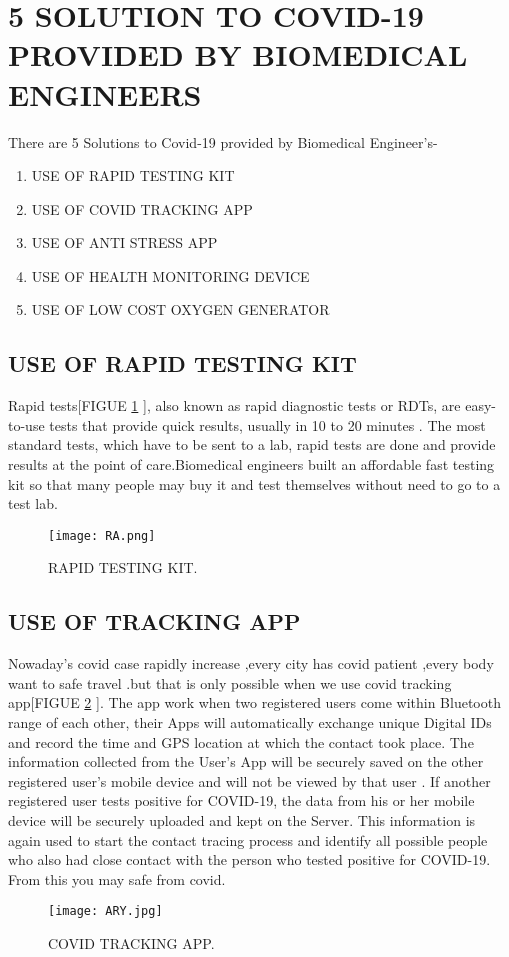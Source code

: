\documentclass[12pt]{article}
\begin{document}
\section{5 SOLUTION TO COVID-19 PROVIDED BY BIOMEDICAL ENGINEERS}
There are 5  Solutions to Covid-19 provided by Biomedical Engineer's-
\begin{enumerate}
  \item USE OF RAPID TESTING KIT
 \item  USE OF COVID TRACKING APP
\item USE OF  ANTI STRESS APP
  \item USE OF HEALTH MONITORING DEVICE
 \item USE OF LOW COST OXYGEN GENERATOR
             
 \end{enumerate}
\clearpage
\subsection{USE OF RAPID TESTING KIT}
Rapid tests[FIGUE \ref{fig_RA} ], also known as rapid diagnostic tests or RDTs, are easy-to-use tests that provide quick results, usually in 10 to 20 minutes . The most standard tests, which have to be sent to a lab, rapid tests are done and provide results at the point of care.Biomedical engineers built an affordable fast testing kit so that many people may buy it and test themselves without need to go to a test  lab.
\begin{figure}[h]
\centering
\texttt{[image: RA.png]}
\caption{RAPID TESTING KIT.}
\label{fig_RA}
\end{figure}
\clearpage
\subsection{USE OF TRACKING APP}
Nowaday's covid case rapidly increase ,every city has covid patient ,every body want to safe travel .but that is only  possible when we use covid tracking app[FIGUE \ref{fig_ARY} ]. The app work when two registered users come within Bluetooth range of each other, their Apps will 
automatically exchange unique Digital IDs and record the time and GPS location at 
which the contact took place. The information collected from the User's App will be securely saved on the other registered user's mobile device and will not be viewed by that user . If another registered user tests positive for COVID-19, the data from his or her mobile device will be securely uploaded and kept on the Server.
This information is again used to start the contact tracing process and identify all possible people who also had close contact with the person who tested positive for COVID-19. From this you may safe from covid.
\begin{figure}[h]
\centering
\texttt{[image: ARY.jpg]}
\caption{COVID TRACKING APP.}
\label{fig_ARY}
\end{figure}
\clearpage
\end{document}
